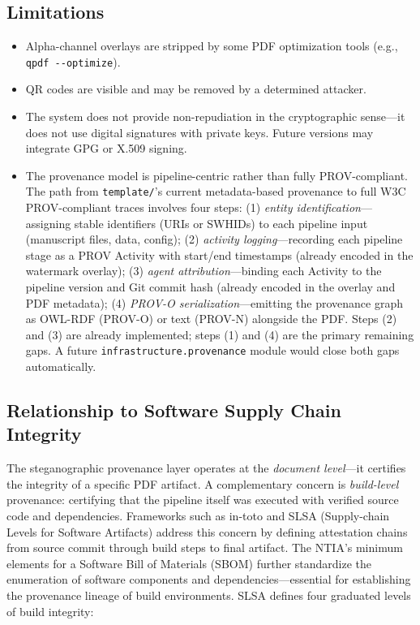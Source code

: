 \documentclass[
]{article}
\providecommand{\tightlist}{%
  \setlength{\itemsep}{0pt}\setlength{\parskip}{0pt}}
\begin{document}
\subsection{Limitations}\label{limitations-1}

\begin{itemize}
\tightlist
\item
  Alpha-channel overlays are stripped by some PDF optimization tools
  (e.g., \texttt{qpdf\ -\/-optimize}).
\item
  QR codes are visible and may be removed by a determined attacker.
\item
  The system does not provide non-repudiation in the cryptographic
  sense---it does not use digital signatures with private keys. Future
  versions may integrate GPG or X.509 signing.
\item
  The provenance model is pipeline-centric rather than fully
  PROV-compliant. The path from \texttt{template/}'s current
  metadata-based provenance to full W3C PROV-compliant traces involves
  four steps: (1) \emph{entity identification}---assigning stable
  identifiers (URIs or SWHIDs) to each pipeline input (manuscript files,
  data, config); (2) \emph{activity logging}---recording each pipeline
  stage as a PROV Activity with start/end timestamps (already encoded in
  the watermark overlay); (3) \emph{agent attribution}---binding each
  Activity to the pipeline version and Git commit hash (already encoded
  in the overlay and PDF metadata); (4) \emph{PROV-O
  serialization}---emitting the provenance graph as OWL-RDF (PROV-O) or
  text (PROV-N) alongside the PDF. Steps (2) and (3) are already
  implemented; steps (1) and (4) are the primary remaining gaps. A
  future \texttt{infrastructure.provenance} module would close both gaps
  automatically.
\end{itemize}

\subsection{Relationship to Software Supply Chain
Integrity}\label{relationship-to-software-supply-chain-integrity}

The steganographic provenance layer operates at the \emph{document
level}---it certifies the integrity of a specific PDF artifact. A
complementary concern is \emph{build-level} provenance: certifying that
the pipeline itself was executed with verified source code and
dependencies. Frameworks such as in-toto \citep{torresarias2019intoto}
and SLSA (Supply-chain Levels for Software Artifacts) address this
concern by defining attestation chains from source commit through build
steps to final artifact. The NTIA's minimum elements for a Software Bill
of Materials (SBOM) \citep{ntia2021sbom} further standardize the
enumeration of software components and dependencies---essential for
establishing the provenance lineage of build environments. SLSA defines
four graduated levels of build integrity:
\end{document}
